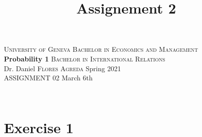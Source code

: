\documentclass[12pt,thmsa]{article}\usepackage[]{graphicx}\usepackage[]{color}
\title{Assignement 2}
\begin{document}
\noindent \textsc{University of Geneva}     \hfill \textsc{Bachelor in Economics and Management} \\
\textbf{Probability 1}                      \hfill \textsc{Bachelor in International Relations} \\
Dr. Daniel \textsc{Flores Agreda}                 \hfill Spring 2021  \\
ASSIGNMENT 02                               \hfill   March 6th



\noindent
\makebox[\linewidth]{\rule{\textwidth}{0.4pt}}\\[1.5ex]





\section*{Exercise 1}
\end{document}
